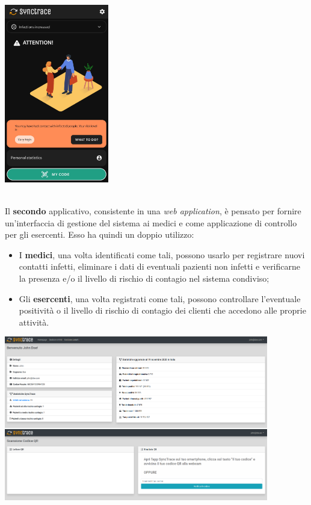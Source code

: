 \begin{minipage}{\linewidth}
  \centering
    \includegraphics[height=7.8cm]{immagini/synctraceandroid}
\end{minipage} \\

Il \textbf{secondo} applicativo, consistente in una \textit{web application}, è pensato per fornire un'interfaccia di gestione del sistema ai medici e come applicazione di controllo per gli esercenti. Esso ha quindi un doppio utilizzo:
\begin{itemize}
  \item I \textbf{medici}, una volta identificati come tali, possono usarlo per registrare nuovi contatti infetti, eliminare i dati di eventuali pazienti non infetti e verificarne la presenza e/o il livello di rischio di contagio nel sistema condiviso;
  \item Gli \textbf{esercenti}, una volta registrati come tali, possono controllare l'eventuale positività o il livello di rischio di contagio dei clienti che accedono alle proprie attività. \\
\end{itemize}

\begin{minipage}{\linewidth}
  \centering
    \includegraphics[height=7.2cm]{immagini/webapp}
\end{minipage} \\

